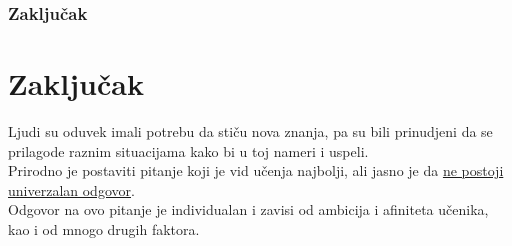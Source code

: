 \documentclass[11pt]{beamer}
\begin{document}
\begin{frame}
	\begin{itemize}
	\end{itemize}
		\centering
		\begin{figure}[h!]
		\label{fig:slika2}
		\end{figure}
\end{frame}


\begin{frame}
    \frametitle{Zaključak}
		\section{Zaključak}
		     Ljudi su oduvek imali potrebu da stiču nova znanja, pa su bili prinudjeni da se prilagode raznim situacijama kako bi u toj nameri i uspeli.\\ Prirodno je postaviti pitanje koji je vid učenja najbolji, ali jasno je da \underline{ne postoji univerzalan odgovor}. \\Odgovor na ovo pitanje je individualan i zavisi od ambicija i afiniteta učenika, kao i od mnogo drugih faktora.
		\small{	
  
  }
\end{frame}
\end{document}
